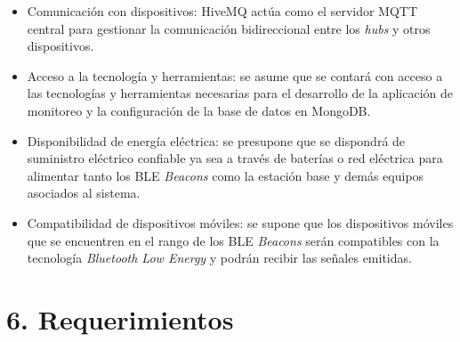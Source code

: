 \documentclass[
11pt, %
]{charter}
\begin{document}
\begin{itemize}
	\item Comunicación con dispositivos: HiveMQ actúa como el servidor MQTT central para gestionar la comunicación bidireccional entre los \textit{hubs} y otros dispositivos. 
	\item Acceso a la tecnología y herramientas: se asume que se contará con acceso a las tecnologías y herramientas necesarias para el desarrollo de la aplicación de monitoreo y la configuración de la base de datos en MongoDB.
	\item Disponibilidad de energía eléctrica: se presupone que se dispondrá de suministro eléctrico confiable ya sea a través de baterías o red eléctrica para alimentar tanto los BLE \textit{Beacons} como la estación base y demás equipos asociados al sistema.
	\item Compatibilidad de dispositivos móviles: se supone que los dispositivos móviles que se encuentren en el rango de los BLE \textit{Beacons} serán compatibles con la tecnología \textit{Bluetooth Low Energy} y podrán recibir las señales emitidas. 
\end{itemize}

\section{6. Requerimientos}
\label{sec:requerimientos}
\end{document}

